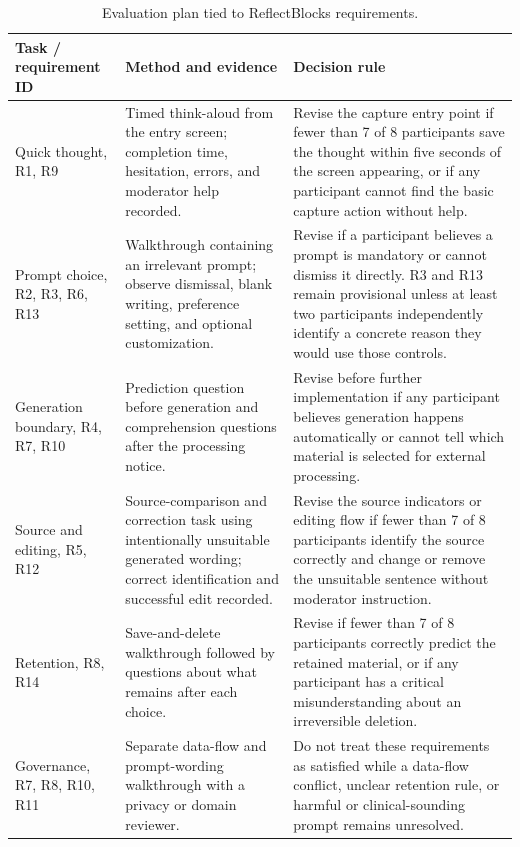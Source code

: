 \documentclass[sigconf,nonacm]{acmart}
\begin{document}
\begin{table}[tb]
\caption{Evaluation plan tied to ReflectBlocks requirements.}
\label{tab:evaluation}
\small
\begin{tabularx}{\textwidth}{@{}p{} X X@{}}
\toprule
Task / requirement ID & Method and evidence & Decision rule \\
\midrule

Quick thought, R1, R9 &
Timed think-aloud from the entry screen; completion time, hesitation,
errors, and moderator help recorded. &
Revise the capture entry point if fewer than 7 of 8 participants save the
thought within five seconds of the screen appearing, or if any participant
cannot find the basic capture action without help. \\

Prompt choice, R2, R3, R6, R13 &
Walkthrough containing an irrelevant prompt; observe dismissal, blank
writing, preference setting, and optional customization. &
Revise if a participant believes a prompt is mandatory or cannot dismiss it
directly. R3 and R13 remain provisional unless at least two participants
independently identify a concrete reason they would use those controls. \\

Generation boundary, R4, R7, R10 &
Prediction question before generation and comprehension questions after the
processing notice. &
Revise before further implementation if any participant believes generation
happens automatically or cannot tell which material is selected for external
processing. \\

Source and editing, R5, R12 &
Source-comparison and correction task using intentionally unsuitable
generated wording; correct identification and successful edit recorded. &
Revise the source indicators or editing flow if fewer than 7 of 8
participants identify the source correctly and change or remove the
unsuitable sentence without moderator instruction. \\

Retention, R8, R14 &
Save-and-delete walkthrough followed by questions about what remains after
each choice. &
Revise if fewer than 7 of 8 participants correctly predict the retained
material, or if any participant has a critical misunderstanding about an
irreversible deletion. \\

Governance, R7, R8, R10, R11 &
Separate data-flow and prompt-wording walkthrough with a privacy or domain
reviewer. &
Do not treat these requirements as satisfied while a data-flow conflict,
unclear retention rule, or harmful or clinical-sounding prompt remains
unresolved. \\

\bottomrule
\end{tabularx}
\end{table}
\end{document}
